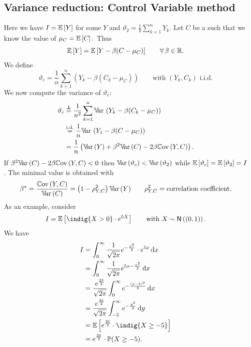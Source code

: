 \documentclass[12pt]{report}
\begin{document}
\subsection{Variance reduction: Control Variable method}
Here we have $I=\mathbb{E}\left[Y\right]$ for some $Y$ and $\vartheta_2=\frac{1}{b}\sum_{k=1}^{n}Y_k$. Let $C$ be a \rv{} such that we know the value of $\mu_C=\mathbb{E}\left[C\right].$ Thus
\begin{equation*}
	\mathbb{E}\left[Y\right]=\mathbb{E}\left[Y-\beta(C-\mu_C)\right]\qquad\forall\,\beta\in\mathbb{R}.
\end{equation*}
We define
\begin{equation*}
	\vartheta_c=\frac{1}{n}\sum_{k=1}^{n}\left(Y_k-\beta(C_k-\mu_{C})\right)\qquad\text{with }(Y_k,C_k)\text{ i.i.d.}
\end{equation*}
We now compute the variance of $\vartheta_c$:
\begin{align*}
	\vartheta_c&\overset{\independent}{=}\frac{1}{n^{2}}\sum_{k=1}^{n}\var\left(Y_k-\beta(C_k-\mu_{C})\right)\\
	&\overset{\text{i.d.}}{=}\frac{1}{n}\var\left(Y_1-\beta(C-\mu_{C})\right)\\
	&=\frac{1}{n}\left(\var(Y)+\beta^{2}\var(C)-2\beta\cov(Y,C)\right).
\end{align*}
If $\beta^{2}\mathbb{V}\!\mathrm{ar}\,(C)-2\beta\mathbb{C}\mathrm{ov}\,(Y,C)<0$ then $\mathbb{V}\!\mathrm{ar}\,(\vartheta_c)<\mathbb{V}\!\mathrm{ar}\,(\vartheta_2)$ while $\mathbb{E}\left[\vartheta_c\right]=\mathbb{E}\left[\vartheta_2\right]=I$. The minimal value is obtained with 
\begin{equation*}
	\beta^{\star}=\frac{\mathbb{C}\mathrm{ov}\,(Y,C)}{\mathbb{V}\!\mathrm{ar}\,(C)}=\left(1-\rho^{2}_{Y,C}\right)\mathbb{V}\!\mathrm{ar}\,(Y)\qquad\rho^{2}_{Y,C}=\text{correlation coefficient}.
\end{equation*}
As an example, consider
\begin{equation*}
	I=\ev{\indig{X>0}\cdot e^{5 X}}\qquad\text{with }X\distnorm{(0,1)}.
\end{equation*}
We have
\begin{align*}
	I&=\int_{0}^{\infty}\frac{1}{\sqrt{2\pi}}e^{-\frac{x^{2}}{2}}\cdot e^{5x}\dx\\
	&=\int_{0}^{\infty}\frac{1}{\sqrt{2\pi}}e^{5x-\frac{x^{2}}{2}}\dx\\
	&=\frac{e^{\frac{25}{2}}}{\sqrt{2\pi}}\int_{0}^{\infty}e^{-\frac{(x-5)^{2}}{2}}\dx\\
	&=\frac{e^{\frac{25}{2}}}{\sqrt{2\pi}}\int_{-5}^{\infty}e^{-\frac{y^{2}}{2}}\dy\\
	&=\ev{e^{\frac{25}{2}}\cdot\indig{X\geq-5}}\\
	&=e^{\frac{25}{2}}\cdot\pr(X\geq-5).
\end{align*}
\end{document}
